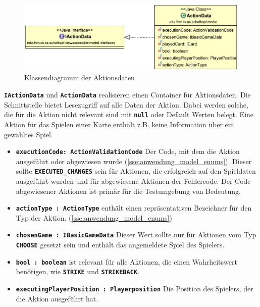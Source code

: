 \documentclass[
							a4paper, 
							11pt, 
							openany, 
							liststotoc,
							parskip=half, 
   							headings=normal
						]{scrreprt}
\begin{document}
{\begin{figure}[H]
\begin{center}
    \includegraphics[width=1.0\textwidth]{./pictures/uml/class_diagram/uml_class_actiondata.pdf}
	\caption[Anwendung/Model -- Klassendiagramm Aktionsdaten]{Klassendiagramm der Aktionsdaten} \label{fig:model_actions}
\end{center}
\end{figure}

\textbf{\texttt{IActionData}} und \textbf{\texttt{ActionData}} realisieren einen Container für Aktionsdaten. Die Schnittstelle bietet Lesezugriff auf alle Daten der Aktion. Dabei werden solche, die für die Aktion nicht relevant sind mit \textbf{\texttt{null}} oder Default Werten belegt. Eine Aktion für das Spielen einer Karte enthält z.B. keine Information über ein gewähltes Spiel.

\begin{itemize}
	\item \textbf{\texttt{executionCode: ActionValidationCode}} Der Code, mit dem die Aktion aus\-ge\-führt oder abgewiesen wurde (\autoref{sse:anwendung_model_enums}). Dieser sollte \textbf{\texttt{EXE\-CU\-TED{\_}CHAN\-GES}} sein für Aktionen, die erfolgreich auf den Spieldaten aus\-ge\-führt wurden und für abgewiesene Aktionen der Fehlercode. Der Code abgewiesener Aktionen ist primär für die Testumgebung von Bedeutung.
	\item \textbf{\texttt{actionType : ActionType}} enthält einen repräsentativen Bezeichner für den Typ der Aktion. (\autoref{sse:anwendung_model_enums})
	\item \textbf{\texttt{chosenGame : IBasicGameData}} Dieser Wert sollte nur für Aktionen vom Typ \textbf{\texttt{CHOOSE}} gesetzt sein und enthält das angemeldete Spiel des Spielers.
	\item \textbf{\texttt{bool : boolean}} ist relevant für alle Aktionen, die einen Wahrheitswert benötigen, wie \textbf{\texttt{STRIKE}} und \textbf{\texttt{STRIKEBACK}}.
	\item \textbf{\texttt{executingPlayerPosition : Playerposition}} Die Position des Spielers, der die Aktion ausgeführt hat.
\end{itemize}

}
\end{document}
